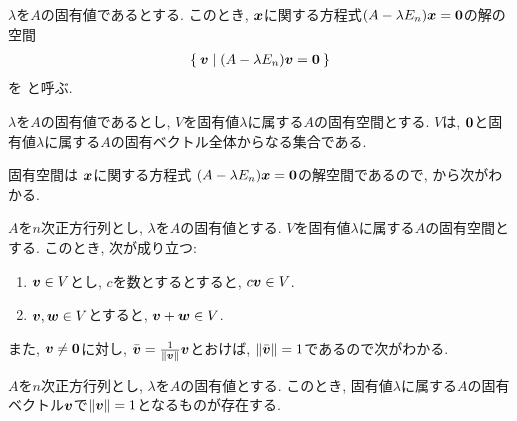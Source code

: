 \begin{definition}
  $\lambda$を$A$の固有値であるとする.
  このとき,
  $\boldsymbol{x}$に関する方程式$(A-\lambda E_n)\boldsymbol{x}=\boldsymbol{0}$の解の空間
  \begin{align*}
    \Set{\boldsymbol{v}| (A-\lambda E_n)\boldsymbol{v}=\boldsymbol{0}}
  \end{align*}
  を
 と呼ぶ.
\end{definition}
\begin{remark}
  $\lambda$を$A$の固有値であるとし,
  $V$を固有値$\lambda$に属する$A$の固有空間とする.
  $V$は,
  $\boldsymbol{0}$と固有値$\lambda$に属する$A$の固有ベクトル全体からなる集合である.
\end{remark}
固有空間は
$\boldsymbol{x}$に関する方程式
$(A-\lambda E_n)\boldsymbol{x}=\boldsymbol{0}$の解空間であるので,
から次がわかる.
\begin{prop}
  $A$を$n$次正方行列とし,
  $\lambda$を$A$の固有値とする.
  $V$を固有値$\lambda$に属する$A$の固有空間とする.
  このとき, 次が成り立つ:
  \begin{enumerate}
  \item $\boldsymbol{v}\in V$とし, $c$を数とするとすると, $c\boldsymbol{v}\in V$.
  \item $\boldsymbol{v},\boldsymbol{w}\in V$とすると, $\boldsymbol{v}+\boldsymbol{w}\in V$.
  \end{enumerate}
\end{prop}
また, $\boldsymbol{v}\neq\boldsymbol{0}$に対し, $\bar{\boldsymbol{v}}=\frac{1}{\|\boldsymbol{v}\|}\boldsymbol{v}$とおけば,
$\|\bar{\boldsymbol{v}}\|=1$であるので次がわかる.
\begin{cor}
  $A$を$n$次正方行列とし,
  $\lambda$を$A$の固有値とする.
  このとき, 
  固有値$\lambda$に属する$A$の固有ベクトル$\boldsymbol{v}$で$\|\boldsymbol{v}\|=1$となるものが存在する.
\end{cor}

